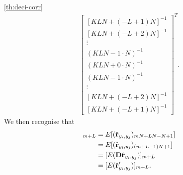 \documentclass[a4paper, openany, oneside]{memoir}
\begin{document}
\begin{blockProofTheorem}{\ref{th:deci-corr}}
\begin{align*}
\begin{bmatrix}
            [KLN+(-L+1)N]^{-1} \\
            [KLN+(-L+2)N]^{-1} \\
            \vdots \\
            (KLN -1 \cdot N)^{-1} \\
            (KLN+ 0 \cdot N)^{-1} \\
            (KLN -1 \cdot N)^{-1} \\
            \vdots \\
            [KLN+(-L+2)N]^{-1} \\
            [KLN+(-L+1)N]^{-1}
         \end{bmatrix}^T.
    \end{align*}
    We then recognise that
    \begin{align*}
        [E(\vec{w} \odot N\hat{\vec{r}}_{y'_i,y'_j})]_{m+L} &= E[(\hat{\vec{r}}_{y_i,y_j})_{mN+LN-N+1}] \\
        &= E[(\hat{\vec{r}}_{y_i,y_j})_{(m+L-1)N+1}] \\
        &= [E(\mat{D} \hat{\vec{r}}_{y_i,y_j})]_{m+L} \\
        &= [E(\hat{\vec{r}}'_{y_i,y_j})]_{m+L}.
    \end{align*}
\end{blockProofTheorem}
\end{document}
